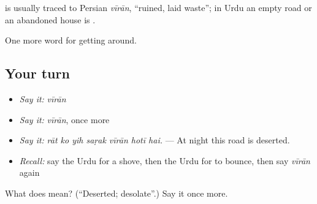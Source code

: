 \begin{cousinweb}
is usually traced to Persian \emph{vīrān}, \textquotedblleft{}ruined, laid waste\textquotedblright{}; in Urdu an empty road or an abandoned house is \textbf{}.
\end{cousinweb}

\begin{grammarlens}[title={What you've built}]
One more word for getting around.
\end{grammarlens}

\subsection*{Your turn}
\begin{itemize}
\raggedright
  \item \emph{Say it:} \emph{vīrān}
  \item \emph{Say it:} \emph{vīrān}, once more
  \item \emph{Say it:} \emph{rāt ko yih saṛak vīrān hotī hai.} — At night this road is deserted.
  \item \emph{Recall:} say the Urdu for a shove, then the Urdu for to bounce, then say \emph{vīrān} again
\end{itemize}

\begin{tcolorbox}[breakable,colback=teal!4,colframe=teal!35!black,title={Before you move on}]
What does  mean? (\textquotedblleft{}Deserted; desolate\textquotedblright{}.) Say it once more.
\end{tcolorbox}
